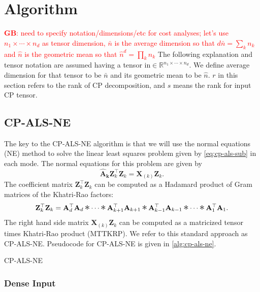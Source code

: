 \documentclass{article}
\newcommand{\mat}[1]{\mathbf{#1}}
\DeclareMathOperator*{\hada}{\scalebox{1.5}{$\ast$}}
\newcommand{\GB}[1]{\textcolor{red}{\textbf{GB}: #1}}
\begin{document}
\section{Algorithm}

\GB{need to specify notation/dimensions/etc for cost analyses; let's use $n_1 \times \cdots \times n_d$ as tensor dimension, $\bar n$ is the average dimension so that $d\bar n = \sum_k n_k$ and $\hat n$ is the geometric mean so that $\hat n^d = \prod_k n_k$}
The following explanation and tensor notation are assumed having a tensor in$\in \mathbb{R}^{n_1 \times \cdots \times n_d}$.
We define average dimension for that tensor to be $\bar n$ and its geometric mean to be $\hat n$.
$r$ in this section refers to the rank of CP decomposition, and $s$ means the rank for input CP tensor.
\subsection{CP-ALS-NE}


The key to the CP-ALS-NE algorithm is that we will use the normal equations (NE) method to solve the linear least squares problem given by \cref{eq:cp-als-sub} in each mode.
The normal equations for this problem are given by
\begin{equation}
  \label{eq:CP-NE}
  \mat{\hat{A}_k}\mat{Z}_k^\top\mat{Z}_k = \mat{X}_{(k)}\mat{Z}_k.
\end{equation}
The coefficient matrix $\mat{Z}_k^\top\mat{Z}_k$ can be computed as a Hadamard product of Gram matrices of the Khatri-Rao factors:
\begin{equation*}
\mat{Z}_k^\top\mat{Z}_k %
= \mat{A}_d^\top \mat{A}_d \hada \cdots \hada \mat{A}_{k+1}^\top\mat{A}_{k+1} \hada \mat{A}_{k-1}^\top\mat{A}_{k-1} \hada \cdots \hada \mat{A}_{1}^\top\mat{A}_{1}.
\end{equation*}
The right hand side matrix $\mat{X}_{(k)}\mat{Z}_k$ can be computed as a matricized tensor times Khatri-Rao product (MTTKRP).
We refer to this standard approach as CP-ALS-NE. Pseudocode for CP-ALS-NE is given in \cref{alg:cp-als-ne}.
\begin{algorithm}[!ht]
  \caption{CP-ALS-NE}
  \label{alg:cp-als-ne}
  
\end{algorithm}

\subsubsection{Dense Input}
\end{document}
